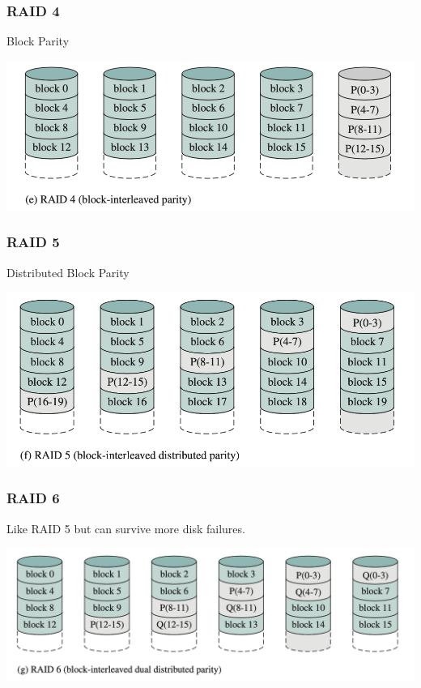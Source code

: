 \begin{frame}
\frametitle{RAID 4}

Block Parity

\begin{center}
	\includegraphics[width= \textwidth]{images/raid4.png}
\end{center}


\end{frame}


\begin{frame}
\frametitle{RAID 5}

Distributed Block Parity

\begin{center}
	\includegraphics[width=\textwidth]{images/raid5.png}
\end{center}

\end{frame}


\begin{frame}
\frametitle{RAID 6}
Like RAID 5 but can survive more disk failures.

\begin{center}
	\includegraphics[width= \textwidth]{images/raid6.png}
\end{center}

\end{frame}


